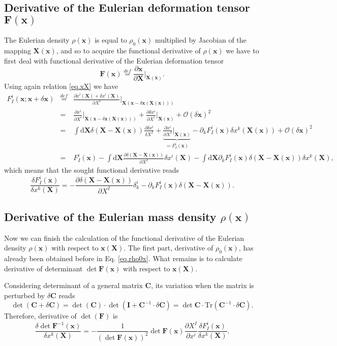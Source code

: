 \documentclass[
10pt, %
a4paper, %
oneside, %
headinclude,footinclude, %
BCOR5mm, %
]{scrartcl}
\newcommand{\xx}{\mathbf{x}}
\newcommand{\XX}{\mathbf{X}}
\newcommand{\Id}{\mathbf{I}}
\newcommand{\Tr}{\mathrm{Tr}}
\newcommand{\CC}{\mathbf{C}}
\newcommand{\dX}{\mathrm{d}\XX}
\newcommand{\OBig}{\mathcal{O}}
\newcommand{\FF}{\mathbf{F}}
\begin{document}
\subsection{Derivative of the Eulerian deformation tensor $\FF(\xx)$}
The Eulerian density $\rho(\xx)$ is equal to $\rho_0(\xx)$ multiplied by Jacobian of the mapping $\XX(\xx)$, and so to acquire the functional derivative of $\rho(\xx)$ we have to first  deal with functional derivative of the Eulerian deformation tensor
\begin{equation}
	\FF(\xx)\stackrel{def}{=}\frac{\partial \xx}{\partial \XX}\Big|_{\XX(\xx)}.
\end{equation}
Using again relation \eqref{eq.xX} we have
\begin{eqnarray}
	F^i_I(\xx;\xx+\delta\xx) &\stackrel{def}{=}&\frac{\partial x^i(\XX) +\delta x^i(\XX)}{\partial X^I}\Big|_{\XX(\xx-\delta\xx(\XX(\xx)))}\\
	&=&\frac{\partial x^i}{\partial X^i}\Big|_{\XX(\xx-\delta\xx(\XX(\xx)))} + \frac{\partial \delta x^i}{\partial X^i}\Big|_{\XX(\xx)}+\OBig(\delta\xx)^2\nonumber\\
	&=&\int\dX\delta(\XX-\XX(\xx)) \frac{\partial \delta x^i}{\delta X^I} +\underbrace{\frac{\partial x^i}{\partial X^I}\Big|_{\XX(\xx)}}_{=F^i_I(\xx)} -\partial_k F^i_I(\xx)\delta x^k(\XX(\xx)) + \OBig(\delta\xx)^2\nonumber\\
	&=&F^i_I(\xx) - \int\dX\frac{\partial \delta(\XX-\XX(\xx))}{\partial X^I}\delta x^i(\XX) -\int\dX\partial_k F^i_I(\xx)\delta(\XX-\XX(\xx))\delta x^k(\XX),\nonumber
\end{eqnarray}
which means that the sought functional derivative reads
\begin{equation}
	\frac{\delta F^i_I(\xx)}{\delta x^k(\XX)} = 
	- \frac{\partial \delta(\XX-\XX(\xx))}{\partial X^I}\delta^i_k -\partial_k F^i_I(\xx)\delta(\XX-\XX(\xx)).
\end{equation}

\subsection{Derivative of the Eulerian mass density $\rho(\xx)$}
Now we can finish the calculation of the functional derivative of the Eulerian density $\rho(\xx)$ with respect to $\xx(\XX)$. The first part, derivative of $\rho_0(\xx)$, has already been obtained before in Eq. \eqref{eq.rho0x}. What remains is to calculate derivative of determinant $\det \FF(\xx)$ with respect to $\xx(\XX)$. 

Considering determinant of a general matrix $\CC$, its variation when the matrix is perturbed by $\delta\CC$ reads
\begin{equation}
	\det(\CC+\delta\CC) = \det(\CC)\cdot\det(\Id+\CC^{-1}\cdot\delta\CC) = \det\CC\cdot\Tr(\CC^{-1}\cdot\delta\CC).
\end{equation}
Therefore, derivative of $\det(\FF)$ is
\begin{equation}
	\frac{\delta \det \FF^{-1}(\xx)}{\delta x^k(\XX)}
	= -\frac{1}{(\det \FF(\xx))^2} \det \FF(\xx) \frac{\partial X^I}{\partial x^i} \frac{\delta F^i_I(\xx)}{\delta x^k(\XX)}.
\end{equation}
\end{document}
